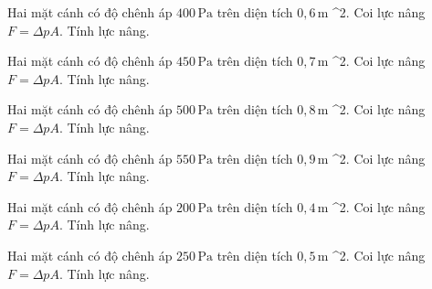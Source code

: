 \begin{ex}
Hai mặt cánh có độ chênh áp $400\,\text{Pa}$ trên diện tích $0,6\,\text{m}$ ^2. Coi lực nâng $F=\Delta pA$. Tính lực nâng.
\end{ex}

\begin{ex}
Hai mặt cánh có độ chênh áp $450\,\text{Pa}$ trên diện tích $0,7\,\text{m}$ ^2. Coi lực nâng $F=\Delta pA$. Tính lực nâng.
\end{ex}

\begin{bt}
Hai mặt cánh có độ chênh áp $500\,\text{Pa}$ trên diện tích $0,8\,\text{m}$ ^2. Coi lực nâng $F=\Delta pA$. Tính lực nâng.
\end{bt}

\begin{bt}
Hai mặt cánh có độ chênh áp $550\,\text{Pa}$ trên diện tích $0,9\,\text{m}$ ^2. Coi lực nâng $F=\Delta pA$. Tính lực nâng.
\end{bt}

\begin{bt}
Hai mặt cánh có độ chênh áp $200\,\text{Pa}$ trên diện tích $0,4\,\text{m}$ ^2. Coi lực nâng $F=\Delta pA$. Tính lực nâng.
\end{bt}

\begin{bt}
Hai mặt cánh có độ chênh áp $250\,\text{Pa}$ trên diện tích $0,5\,\text{m}$ ^2. Coi lực nâng $F=\Delta pA$. Tính lực nâng.
\end{bt}

